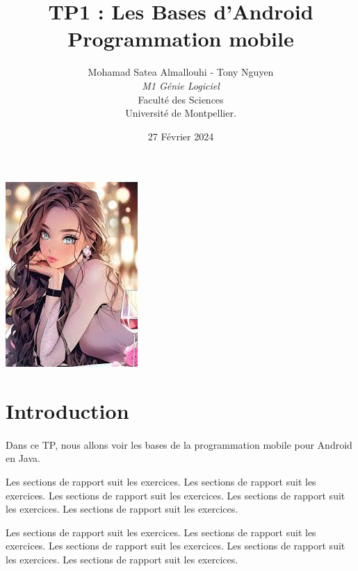 \documentclass[a4paper]{article}
\title{  TP1 : Les Bases d'Android\\         %
  Programmation mobile}
\author{Mohamad Satea Almallouhi - Tony Nguyen\\
  \emph{M1 Génie Logiciel}\\
  Faculté des Sciences\\
Université de Montpellier.}
\date{27 Février 2024}
\begin{document}
\maketitle                    %

\begin{center}
  \includegraphics[scale=1]{cuteGirl.jpeg}
\end{center}



\newpage
\tableofcontents
\section*{Introduction}
  \paragraph{}
    Dans ce TP, nous allons voir les bases de la programmation mobile pour Android en Java.
  
    Les sections de rapport suit les exercices.
    Les sections de rapport suit les exercices. Les sections de rapport suit les exercices. Les sections de rapport suit les exercices. Les sections de rapport suit les exercices.
    
    Les sections de rapport suit les exercices.
    Les sections de rapport suit les exercices. Les sections de rapport suit les exercices. Les sections de rapport suit les exercices. Les sections de rapport suit les exercices.
\end{document}
